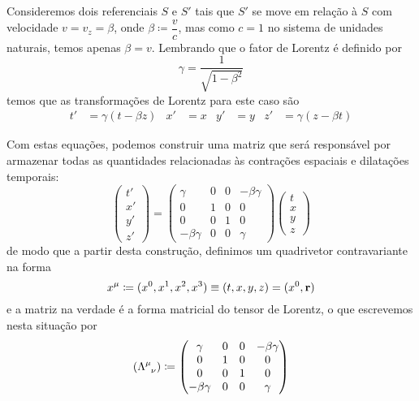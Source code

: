 Consideremos dois referenciais $S$ e $S'$ tais que $S'$ se move em relação à $S$ com velocidade $v = v_{z} = \beta$, onde $\beta \coloneqq \dfrac{v}{c}$, mas como $c=1$ no sistema de unidades naturais, temos apenas $\beta = v$. Lembrando que o fator de Lorentz é definido por
    \begin{equation*}
        \gamma = \dfrac{1}{\sqrt{1 - \beta^2}}
    \end{equation*}
temos que as transformações de Lorentz para este caso são 
    \begin{align*}
        t' &= \gamma(t - \beta z) &
        x' &= x &
        y' &= y &
        z' &= \gamma(z - \beta t)
    \end{align*}

Com estas equações, podemos construir uma matriz que será responsável por armazenar todas as quantidades relacionadas às contrações espaciais e dilatações temporais:
    \begin{equation}\label{eq: transformations}
        \begin{pmatrix}
            t' \\ x' \\ y' \\ z'
        \end{pmatrix} = 
        \begin{pmatrix}
            \gamma & 0 & 0 & -\beta \gamma \\
            0 & 1 & 0 & 0 \\
            0 & 0 & 1 & 0 \\
            -\beta \gamma & 0 & 0 & \gamma
        \end{pmatrix} 
        \begin{pmatrix}
            t \\ x \\ y \\ z
        \end{pmatrix}
    \end{equation}
de modo que a partir desta construção, definimos um quadrivetor contravariante na forma
    \begin{equation*}
        x^{\mu} \coloneqq(x^{0}, x^{1}, x^{2}, x^{3}) \equiv  (t, x, y, z) = (x^{0}, \vb{r})
    \end{equation*}
e a matriz na verdade é a forma matricial do tensor de Lorentz, o que escrevemos nesta situação por
    \begin{equation*}
        (\tensor{\Lambda}{^{\mu}_{\nu}}) \coloneqq 
        \begin{pmatrix}
            \gamma & 0 & 0 & -\beta \gamma \\
            0 & 1 & 0 & 0 \\
            0 & 0 & 1 & 0 \\
            -\beta \gamma & 0 & 0 & \gamma
        \end{pmatrix} 
    \end{equation*}

